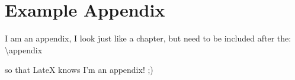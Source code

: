 \chapter{Example Appendix} \label{appendix:example}
I am an appendix, I look just like a chapter, but need to be included after the:\\
\textbackslash appendix

so that LateX knows I'm an appendix! ;)